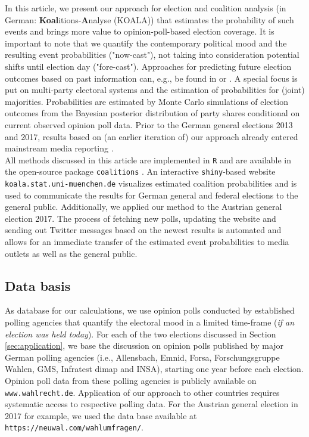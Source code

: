 \documentclass[smallcondensed]{svjour3}     %
\begin{document}
In this article, we present our approach for election and coalition analysis
(in German: \textbf{Koal}itions-\textbf{A}nalyse (KOALA)) that estimates the
probability of such events and brings more value to opinion-poll-based election
coverage. It is important to note that we quantify the contemporary political mood
and the resulting event probabilities ("now-cast"), not taking into consideration
potential shifts until election day ("fore-cast"). Approaches for predicting
future election outcomes based on past information can, e.g., be found in
\citet{graefe_2017} or \citet{norpoth_gschwend_2010}. A special focus is put on
multi-party electoral systems and the estimation of probabilities for (joint) majorities.
Probabilities are estimated by Monte Carlo simulations of election outcomes from the
Bayesian posterior distribution of party shares conditional on current observed
opinion poll data. Prior to the German general elections 2013 and 2017, results
based on (an earlier iteration of) our approach already entered mainstream media
reporting \citep[cf.][]{wahlistik_2013, gelitz_2017}.\\

All methods discussed in this article are implemented in \texttt{R} \citep{r_2017}
and are available in the open-source package \texttt{coalitions} \citep{bender_bauer_2018}.
An interactive \texttt{shiny}-based \citep{chang_2017} website
\texttt{koala.stat.uni-\allowbreak muenchen.\allowbreak de} visualizes estimated
coalition probabilities and is used to communicate the results for German general
and federal elections to the general public. Additionally, we applied our method
to the Austrian general election 2017. The process of fetching new polls,
updating the website and sending out Twitter messages based on the newest results
is automated and allows for an immediate transfer of the estimated event
probabilities to media outlets as well as the general public.

\subsection{Data basis}\label{ssec:data-basis}
As database for our calculations, we use opinion polls conducted by established
polling agencies that quantify the electoral mood in a limited time-frame
(\textit{if an election was held today}). For each of the two elections discussed
in Section \ref{sec:application}, we base the discussion on opinion polls published
by major German polling agencies (i.e., Allensbach, Emnid, Forsa, Forschungsgruppe Wahlen,
GMS, Infratest dimap and INSA), starting one year before each election.
Opinion poll data from these polling agencies is publicly available
on \texttt{www.wahlrecht.de}. Application of our approach to other countries
requires systematic access to respective polling data. For the Austrian general
election in 2017 for example, we used the data base available at
\texttt{https://neuwal.com/wahlumfragen/}.
\end{document}
